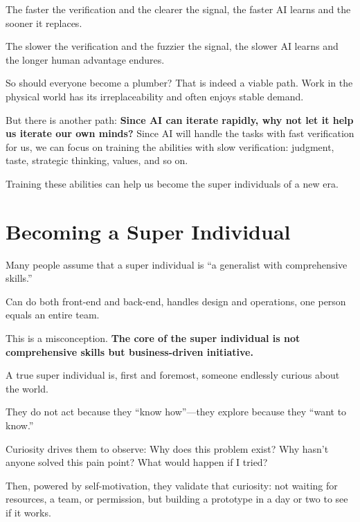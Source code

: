 \begin{importantbox}
The faster the verification and the clearer the signal, the faster AI learns and the sooner it replaces.

The slower the verification and the fuzzier the signal, the slower AI learns and the longer human advantage endures.
\end{importantbox}

So should everyone become a plumber?
That is indeed a viable path.
Work in the physical world has its irreplaceability and often enjoys stable demand.

But there is another path:
\textbf{Since AI can iterate rapidly, why not let it help us iterate our own minds?}
Since AI will handle the tasks with fast verification for us, we can focus on training the abilities with slow verification: judgment, taste, strategic thinking, values, and so on.

\vspace{1em}

Training these abilities can help us become the super individuals of a new era.
\newpage
\section{Becoming a Super Individual}

Many people assume that a super individual is ``a generalist with comprehensive skills.''

Can do both front-end and back-end, handles design and operations, one person equals an entire team.

This is a misconception. \textbf{The core of the super individual is not comprehensive skills but business-driven initiative.}

A true super individual is, first and foremost, someone endlessly curious about the world.

They do not act because they ``know how''---they explore because they ``want to know.''

Curiosity drives them to observe: Why does this problem exist? Why hasn't anyone solved this pain point? What would happen if I tried?

Then, powered by self-motivation, they validate that curiosity: not waiting for resources, a team, or permission, but building a prototype in a day or two to see if it works.

\vspace{1em}

